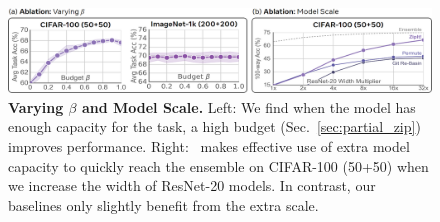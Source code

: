 \begin{figure}
    \centering
    \includegraphics[width=\linewidth]{figures/imgs/varying_beta_and_scale.png}
    \caption{{\bf Varying $\beta$ and Model Scale.} 
    Left: 
    We find when the model has enough capacity for the task, a high budget (Sec.~\ref{sec:partial_zip}) improves performance. 
    Right: 
    \name{}\ makes effective use of extra model capacity to quickly reach the ensemble on CIFAR-100 (50+50) when we increase the width of ResNet-20 models. 
    In contrast, our baselines only slightly benefit from the extra scale.
    }
    \label{fig:variations}
\end{figure}



